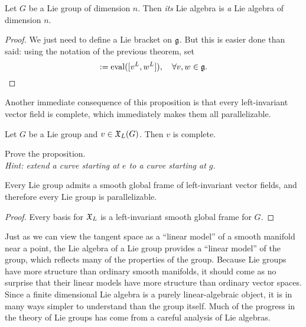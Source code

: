 \begin{corollary}
	Let $G$ be a Lie group of dimension $n$.
	Then \emph{its} Lie algebra is \emph{a} Lie algebra of dimension $n$.
\end{corollary}
\begin{proof}
	We just need to define a Lie bracket on $\mathfrak{g}$.
	But this is easier done than said: using the notation of the previous theorem, set
	\begin{equation}
		[v,w] := \mathrm{eval}([v^L, w^L]), \quad \forall v,w\in\fg.
	\end{equation}
\end{proof}

Another immediate consequence of this proposition is that every left-invariant vector field is complete, which immediately makes them all parallelizable.

\begin{proposition}\label{prop:XLcomplete}
	Let $G$ be a Lie group and $v\in\mathfrak{X}_L(G)$.
	Then $v$ is complete.
\end{proposition}
\begin{exercise}
	Prove the proposition.\\
	\textit{\small Hint: extend a curve starting at $e$ to a curve starting at $g$.}
\end{exercise}

\begin{corollary}
	Every Lie group admits a smooth global frame of  left-invariant vector fields, and therefore every Lie group is parallelizable.
\end{corollary}
\begin{proof}
	Every basis for $\mathfrak{X}_L$ is a left-invariant smooth global frame for $G$.
\end{proof}

Just as we can view the tangent space as a ``linear model'' of a smooth manifold near a point, the Lie algebra of a Lie group provides a ``linear model'' of the group, which reflects many of the properties of the group.
Because Lie groups have more structure than ordinary smooth manifolds, it should come as no surprise that their linear models have more structure than ordinary vector spaces.
Since a finite dimensional Lie algebra is a purely linear-algebraic object, it is in many ways simpler to understand than the group itself.
Much of the progress in the theory of Lie groups has come from a careful analysis of Lie algebras.

